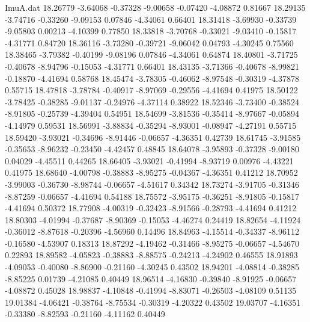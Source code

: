 \begin{filecontents}{ImuA.dat}
  18.26779   -3.64068   -0.37328   -9.00658   -0.07420   -4.08872    0.81667
  18.29135   -3.74716   -0.33260   -9.09153    0.07846   -4.34061    0.66401
  18.31418   -3.69930   -0.33739   -9.05803    0.00213   -4.10399    0.77850
  18.33818   -3.70768   -0.33021   -9.03410   -0.15817   -4.31771    0.84720
  18.36116   -3.73280   -0.39721   -9.06042    0.04793   -4.30245    0.75560
  18.38465   -3.79382   -0.40199   -9.08196    0.07846   -4.34061    0.64874
  18.40801   -3.71725   -0.40678   -8.94796   -0.15053   -4.31771    0.66401
  18.43135   -3.71366   -0.40678   -8.99821   -0.18870   -4.41694    0.58768
  18.45474   -3.78305   -0.46062   -8.97548   -0.30319   -4.37878    0.55715
  18.47818   -3.78784   -0.40917   -8.97069   -0.29556   -4.41694    0.41975
  18.50122   -3.78425   -0.38285   -9.01137   -0.24976   -4.37114    0.38922
  18.52346   -3.73400   -0.38524   -8.91805   -0.25739   -4.39404    0.54951
  18.54699   -3.81536   -0.35414   -8.97667   -0.05894   -4.14979    0.59531
  18.56991   -3.88834   -0.35294   -8.93001   -0.08947   -4.27191    0.55715
  18.59420   -3.93021   -0.34696   -8.91446   -0.06657   -4.36351    0.42739
  18.61745   -3.91585   -0.35653   -8.96232   -0.23450   -4.42457    0.48845
  18.64078   -3.95893   -0.37328   -9.00180    0.04029   -4.45511    0.44265
  18.66405   -3.93021   -0.41994   -8.93719    0.00976   -4.43221    0.41975
  18.68640   -4.00798   -0.38883   -8.95275   -0.04367   -4.36351    0.41212
  18.70952   -3.99003   -0.36730   -8.98744   -0.06657   -4.51617    0.34342
  18.73274   -3.91705   -0.31346   -8.87259   -0.06657   -4.41694    0.54188
  18.75572   -3.95175   -0.36251   -8.91805   -0.15817   -4.41694    0.50372
  18.77908   -4.00319   -0.32423   -8.91566   -0.28793   -4.41694    0.41212
  18.80303   -4.01994   -0.37687   -8.90369   -0.15053   -4.46274    0.24419
  18.82654   -4.11924   -0.36012   -8.87618   -0.20396   -4.56960    0.14496
  18.84963   -4.15514   -0.34337   -8.96112   -0.16580   -4.53907    0.18313
  18.87292   -4.19462   -0.31466   -8.95275   -0.06657   -4.54670    0.22893
  18.89582   -4.05823   -0.38883   -8.88575   -0.24213   -4.24902    0.46555
  18.91893   -4.09053   -0.40080   -8.86900   -0.21160   -4.30245    0.43502
  18.94201   -4.08814   -0.38285   -8.85225    0.01739   -4.21085    0.40449
  18.96514   -4.16830   -0.39840   -8.91925   -0.06657   -4.08872    0.45028
  18.98837   -4.10848   -0.41994   -8.83071   -0.26503   -4.08109    0.51135
  19.01384   -4.06421   -0.38764   -8.75534   -0.30319   -4.20322    0.43502
  19.03707   -4.16351   -0.33380   -8.82593   -0.21160   -4.11162    0.40449

\end{filecontents}
